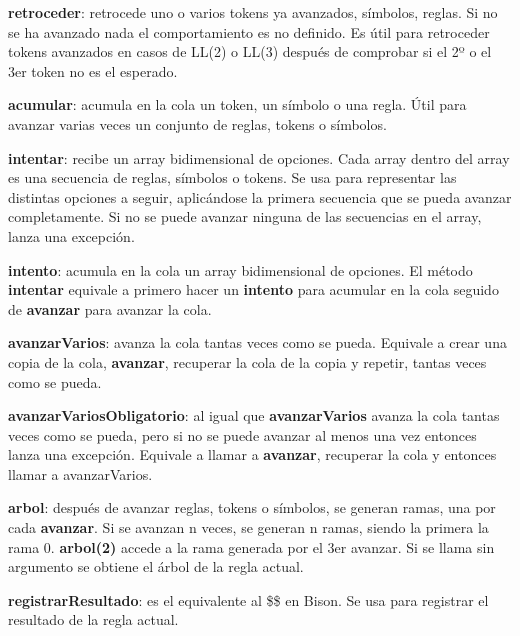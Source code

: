 \documentclass{report}
\begin{document}
	\vspace{10px}
	\noindent
	\textbf{retroceder}: retrocede uno o varios tokens ya avanzados, símbolos, reglas. Si no se ha avanzado nada el comportamiento es no definido. Es útil para retroceder tokens avanzados en casos de LL(2) o LL(3) después de comprobar si el 2º o el 3er token no es el esperado. 
	
	\vspace{10px}
	\noindent
	\textbf{acumular}: acumula en la cola un token, un símbolo o una regla. Útil para avanzar varias veces un conjunto de reglas, tokens o símbolos.
	
	\vspace{10px}
	\noindent
	\textbf{intentar}: recibe un array bidimensional de opciones. Cada array dentro del array es una secuencia de reglas, símbolos o tokens. Se usa para representar las distintas opciones a seguir, aplicándose la primera secuencia que se pueda avanzar completamente. Si no se puede avanzar ninguna de las secuencias en el array, lanza una excepción. 
	
	\vspace{10px}
	\noindent
	\textbf{intento}: acumula en la cola un array bidimensional de opciones. El método \textbf{intentar} equivale a primero hacer un \textbf{intento} para acumular en la cola seguido de \textbf{avanzar} para avanzar la cola.
	
	\vspace{10px}
	\noindent
	\textbf{avanzarVarios}: avanza la cola tantas veces como se pueda. Equivale a crear una copia de la cola, \textbf{avanzar}, recuperar la cola de la copia y repetir, tantas veces como se pueda. 
	
	\vspace{10px}
	\noindent
	\textbf{avanzarVariosObligatorio}: al igual que \textbf{avanzarVarios} avanza la cola tantas veces como se pueda, pero si no se puede avanzar al menos una vez entonces lanza una excepción. Equivale a llamar a \textbf{avanzar}, recuperar la cola y entonces llamar a avanzarVarios.
	
	\vspace{10px}
	\textbf{arbol}: después de avanzar reglas, tokens o símbolos, se generan ramas, una por cada \textbf{avanzar}. Si se avanzan n veces, se generan n ramas, siendo la primera la rama 0. \textbf{arbol(2)} accede a la rama generada por el 3er avanzar. Si se llama sin argumento se obtiene el árbol de la regla actual.
	
	\vspace{10px}
	\textbf{registrarResultado}: es el equivalente al \$\$ en Bison. Se usa para registrar el resultado de la regla actual.
	
\end{document}

